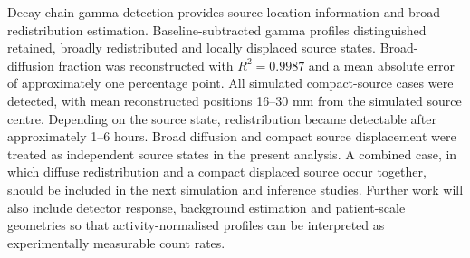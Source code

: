 \documentclass{iopconfser}
\begin{document}
Decay-chain gamma detection provides source-location information and broad redistribution estimation. Baseline-subtracted gamma profiles distinguished retained, broadly redistributed and locally displaced source states. Broad-diffusion fraction was reconstructed with \(R^2=0.9987\) and a mean absolute error of approximately one percentage point. All simulated compact-source cases were detected, with mean reconstructed positions 16–30 mm from the simulated source centre. Depending on the source state, redistribution became detectable after approximately 1–6 hours. 
Broad diffusion and compact source displacement were treated
as independent source states in the present analysis. A combined case, in
which diffuse redistribution and a compact displaced source occur together,
should be included in the next simulation and inference studies. Further work
will also include detector response, background estimation and patient-scale
geometries so that activity-normalised profiles can be interpreted as
experimentally measurable count rates.
\end{document}
